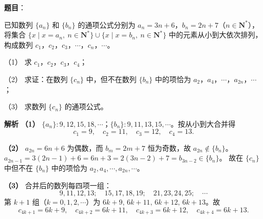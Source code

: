 \begin{answer}

\textbf{题目}：

已知数列 $\{a_n\}$ 和 $\{b_n\}$ 的通项公式分别为 $a_n=3n+6$，$b_n=2n+7$（$n\in\mathbf N^*$），将集合 $\{x\mid x=a_n,\ n\in\mathbf N^*\}\cup\{x\mid x=b_n,\ n\in\mathbf N^*\}$ 中的元素从小到大依次排列，构成数列 $c_1$，$c_2$，$c_3$，$\cdots$，$c_n$，$\cdots$。

（1） 求 $c_1$，$c_2$，$c_3$，$c_4$；

（2） 求证：在数列 $\{c_n\}$ 中，但不在数列 $\{b_n\}$ 中的项恰为 $a_2$，$a_4$，$\cdots$，$a_{2n}$，$\cdots$；

（3） 求数列 $\{c_n\}$ 的通项公式。

\textbf{解析}
\textbf{（1）} $\{a_n\}:9,12,15,18,\cdots$；$\{b_n\}:9,11,13,15,\cdots$。按从小到大合并得
\nopagebreak[4]
\[c_1=9,\quad c_2=11,\quad c_3=12,\quad c_4=13.\]

\textbf{（2）} $a_{2n}=6n+6$ 为偶数，而 $b_m=2m+7$ 恒为奇数，故 $a_{2n}\notin\{b_n\}$。
$a_{2n-1}=3(2n-1)+6=6n+3=2(3n-2)+7=b_{3n-2}\in\{b_n\}$。
故在 $\{c_n\}$ 中但不在 $\{b_n\}$ 中的项恰为 $a_2,a_4,\cdots,a_{2n},\cdots$。

\textbf{（3）} 合并后的数列每四项一组：
\nopagebreak[4]
\[9,11,12,13;\quad 15,17,18,19;\quad 21,23,24,25;\quad\cdots\]
第 $k+1$ 组（$k=0,1,2,\cdots$）为 $6k+9,\,6k+11,\,6k+12,\,6k+13$。故
\nopagebreak[4]
\[c_{4k+1}=6k+9,\quad c_{4k+2}=6k+11,\quad c_{4k+3}=6k+12,\quad c_{4k+4}=6k+13.\]




\end{answer}
